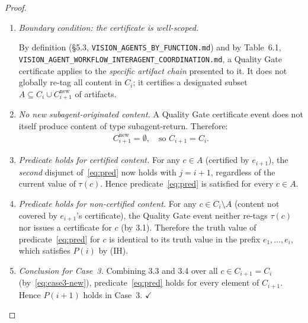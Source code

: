 \documentclass[12pt]{article}
\theoremstyle{definition}
\newcommand{\code}[1]{\texttt{#1}}
\newcommand{\VisionFunc}{\code{VISION\_AGENTS\_\allowbreak BY\_FUNCTION.md}}
\newcommand{\VisionFlow}{\code{VISION\_AGENT\_\allowbreak WORKFLOW\_\allowbreak INTERAGENT\_\allowbreak COORDINATION.md}}
\begin{document}
\begin{proof}
\begin{enumerate}
    \begin{enumerate}
        \item[3.1] \emph{Boundary condition: the certificate is
                   well-scoped.}
                   \begin{sloppypar}
                   By definition (\S5.3,
                   \VisionFunc{}) and by
                   Table~6.1, \VisionFlow{}, a Quality Gate certificate
                   applies to the \emph{specific artifact chain} presented
                   to it.  It does not globally re-tag all content in
                   $C_i$; it certifies a designated subset
                   $A \subseteq C_i \cup C^{\mathrm{new}}_{i+1}$ of
                   artifacts.
                   \end{sloppypar}
        \item[3.2] \emph{No new subagent-originated content.}
                   A Quality Gate certificate event does not itself produce
                   content of type subagent-return.  Therefore:
                   \begin{align}
                       \label{eq:case3-new}
                       C^{\mathrm{new}}_{i+1} = \emptyset,
                       \quad \text{so } C_{i+1} = C_i.
                   \end{align}
        \item[3.3] \emph{Predicate holds for certified content.}
                   For any $c \in A$ (certified by $e_{i+1}$), the
                   \emph{second} disjunct of~\eqref{eq:pred} now holds
                   with $j = i+1$, regardless of the current value of
                   $\tau(c)$.  Hence predicate~\eqref{eq:pred} is
                   satisfied for every $c \in A$.
        \item[3.4] \emph{Predicate holds for non-certified content.}
                   For any $c \in C_i \setminus A$ (content not covered
                   by $e_{i+1}$'s certificate), the Quality Gate event
                   neither re-tags $\tau(c)$ nor issues a certificate
                   for $c$ (by 3.1).  Therefore the truth value of
                   predicate~\eqref{eq:pred} for $c$ is identical to its
                   truth value in the prefix $e_1,\ldots,e_i$, which
                   satisfies $P(i)$ by (IH).
        \item[3.5] \emph{Conclusion for Case~3.}
                   Combining 3.3 and 3.4 over all $c \in C_{i+1} = C_i$
                   (by~\eqref{eq:case3-new}), predicate~\eqref{eq:pred}
                   holds for every element of $C_{i+1}$.  Hence $P(i+1)$
                   holds in Case~3. \hfill$\checkmark$
    \end{enumerate}
\end{enumerate}


\end{proof}
\end{document}
